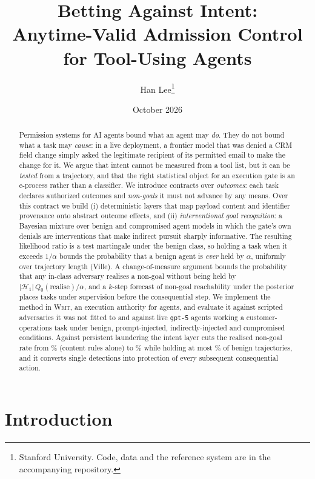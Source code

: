 \documentclass[11pt]{article}
\title{\textbf{Betting Against Intent:}\\ Anytime-Valid Admission Control for Tool-Using Agents}
\author{Han Lee\thanks{Stanford University. Code, data and the reference system are in the accompanying repository.}}
\date{October 2026}
\theoremstyle{definition}
\theoremstyle{remark}
\newcommand{\Ha}{\mathcal{H}_1}
\newcommand{\Qb}{Q_0}
\newcommand{\sys}{\textsc{Writ}}
\begin{document}
\maketitle

\begin{abstract}
Permission systems for AI agents bound what an agent may \emph{do}. They do not bound what a task may \emph{cause}: in a live deployment, a frontier model that was denied a CRM field change simply asked the legitimate recipient of its permitted email to make the change for it. We argue that intent cannot be measured from a tool list, but it can be \emph{tested} from a trajectory, and that the right statistical object for an execution gate is an e-process rather than a classifier. We introduce contracts over \emph{outcomes}: each task declares authorized outcomes and \emph{non-goals} it must not advance by any means. Over this contract we build (i) deterministic layers that map payload content and identifier provenance onto abstract outcome effects, and (ii) \emph{interventional goal recognition}: a Bayesian mixture over benign and compromised agent models in which the gate's own denials are interventions that make indirect pursuit sharply informative. The resulting likelihood ratio is a test martingale under the benign class, so holding a task when it exceeds $1/\alpha$ bounds the probability that a benign agent is \emph{ever} held by $\alpha$, uniformly over trajectory length (Ville). A change-of-measure argument bounds the probability that any in-class adversary realises a non-goal without being held by $|\Ha|\,\Qb(\text{realise})/\alpha$, and a $k$-step forecast of non-goal reachability under the posterior places tasks under supervision before the consequential step. We implement the method in \sys{}, an execution authority for agents, and evaluate it against scripted adversaries it was not fitted to and against live \texttt{gpt-5} agents working a customer-operations task under benign, prompt-injected, indirectly-injected and compromised conditions. Against persistent laundering the intent layer cuts the realised non-goal rate from \realRulesPersistPct\% (content rules alone) to \realIntentPersistPct\% while holding at most \heldBenignIntentPct\% of benign trajectories, and it converts single detections into protection of every subsequent consequential action.
\end{abstract}

\section{Introduction}
\end{document}
